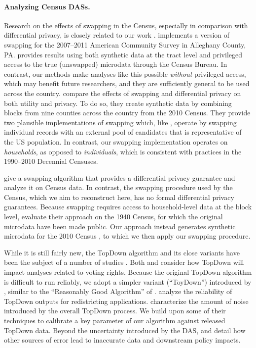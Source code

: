 \paragraph*{Analyzing Census DASs.}

Research on the effects of swapping in the Census, especially in comparison with differential privacy, is closely related to our work \citep{kim2015effect,christ2022differential,bailie2023can}.
\citet{kim2015effect} implements a version of swapping for the 2007--2011 American Community Survey in Alleghany County, PA.
\citet{kim2015effect} provides results using both synthetic data at the tract level and privileged access to the true (unswapped) microdata through the Census Bureau.
In contrast, our methods make analyses like this possible \emph{without} privileged access, which may benefit future researchers, and they are sufficiently general to be used across the country.
\citet{christ2022differential} compare the effects of swapping and differential privacy on both utility and privacy.
To do so, they create synthetic data by combining blocks from nine counties across the country from the 2010 Census.
They provide two plausible implementations of swapping which, like \citet{kim2015effect}, operate by swapping individual records with an external pool of candidates that is representative of the US population.
In contrast, our swapping implementation operates on \textit{households}, as opposed to \textit{individuals}, which is consistent with practices in the 1990--2010 Decennial Censuses.

\citet{bailie2023can} give a swapping algorithm that provides a differential privacy guarantee and analyze it on Census data.
In contrast, the swapping procedure used by the Census, which we aim to reconstruct here, has no formal differential privacy guarantees.
Because swapping requires access to household-level data at the block level, \citet{bailie2023can} evaluate their approach on the 1940 Census, for which the original microdata have been made public.
Our approach instead generates synthetic microdata for the 2010 Census \citep{syn-data}, to which we then apply our swapping procedure.


While it is still fairly new, the TopDown algorithm and its close variants have been the subject of a number of studies \citep{wright2021empirical,cohen2021census,kenny2021impact,kenny2023evaluating}.
Both \citet{cohen2021census} and \citet{kenny2021impact} consider how TopDown will impact analyses related to voting rights.
Because the original TopDown algorithm is difficult to run reliably, we adopt a simpler variant (``ToyDown'') introduced by \citet{cohen2021census}, similar to the ``Reasonably Good Algorithm'' of \citet{long-jason-report}.
\citet{wright2021empirical} analyze the reliability of TopDown outputs for redistricting applications.
\citet{kenny2023evaluating} characterize the amount of noise introduced by the overall TopDown process.
We build upon some of their techniques to calibrate a key parameter of our algorithm against released TopDown data.
Beyond the uncertainty introduced by the DAS, \citet{steed2022policy} and \citet{boyd2022differential} detail how other sources of error lead to inaccurate data and downstream policy impacts.

